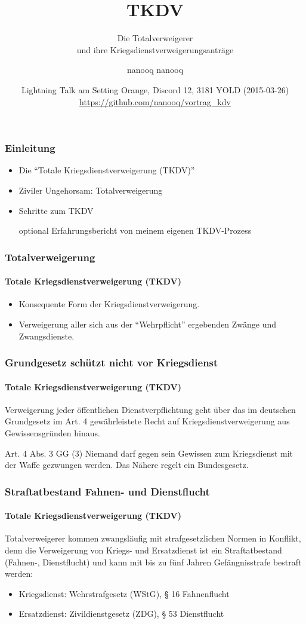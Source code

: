 \documentclass{beamer}
\title[TKDV] %
{TKDV}
\subtitle{Die Totalverweigerer \\und ihre Kriegsdienstverweigerungsanträge}
\author[nanooq nanooq] 
{nanooq nanooq}
\institute[Hackspace Siegen e.~V.] %
{
	\inst{1}%
	Hackspace Siegen e.~V.\\
	Effertsufer 104\\
	57072 Siegen
}
\date[2015-03-26] %
{Lightning Talk am Setting Orange, Discord 12, 3181 YOLD (2015-03-26)\\
	\href{https://github.com/nanooq/vortrag_kdv}{https://github.com/nanooq/vortrag\_kdv}}
\begin{document}
	
	\frame{\titlepage}
	
	\begin{frame}
	  	\frametitle{Einleitung}	  
	  	\begin{itemize}
	  		\item Die \enquote{Totale Kriegsdienstverweigerung (TKDV)}
	  		\item Ziviler Ungehorsam: Totalverweigerung
	  		\item Schritte zum TKDV
		  	\item[optional] Erfahrungsbericht von meinem eigenen TKDV-Prozess
	  	\end{itemize}		
	\end{frame}

	\begin{frame}
	  	\frametitle{Totalverweigerung}
	  	\framesubtitle{Totale Kriegsdienstverweigerung (TKDV)}
	  	\begin{itemize}
	  		\item Konsequente Form der Kriegsdienstverweigerung. 		
	  		\item Verweigerung aller sich aus der \enquote{Wehrpflicht} ergebenden Zwänge und Zwangsdienste. 
	  	\end{itemize}
  	\end{frame}
  	
  	\begin{frame}
	  	\frametitle{Grundgesetz schützt nicht vor Kriegsdienst}
	  	\framesubtitle{Totale Kriegsdienstverweigerung (TKDV)}
	  	
	  	Verweigerung jeder öffentlichen Dienstverpflichtung geht über das im deutschen Grundgesetz im Art. 4 gewährleistete Recht auf Kriegsdienstverweigerung aus Gewissensgründen hinaus.

	  	\begin{block}{Art. 4 Abs. 3 GG}
	  		(3) Niemand darf gegen sein Gewissen zum Kriegsdienst mit der Waffe gezwungen werden. Das Nähere regelt ein Bundesgesetz.
	  	\end{block}
  	\end{frame}
	
	\begin{frame}
	  	\frametitle{Straftatbestand Fahnen- und Dienstflucht}
	  	\framesubtitle{Totale Kriegsdienstverweigerung (TKDV)}

	  	Totalverweigerer kommen zwangsläufig mit strafgesetzlichen Normen in Konflikt, denn die Verweigerung von Kriegs- und Ersatzdienst ist ein Straftatbestand (Fahnen-, Dienstflucht) und kann mit bis zu fünf Jahren Gefängnisstrafe bestraft werden:
	  	
	  	\begin{itemize}
	  		\item Kriegsdienst:  Wehrstrafgesetz (WStG), § 16 Fahnenflucht
	  		\item Ersatzdienst: Zivildienstgesetz (ZDG), § 53 Dienstflucht	  		
	  	\end{itemize}
	\end{frame}
		
\end{document}

